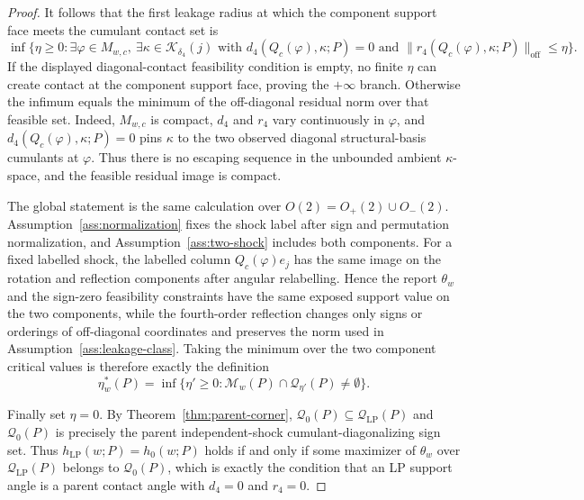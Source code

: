 \documentclass[11pt]{article}
\theoremstyle{definition}
\theoremstyle{plain}
\theoremstyle{remark}
\begin{document}
\begin{proof}
It follows that the first leakage radius at which the component support face meets the cumulant contact set is
\[
\inf\{\eta\ge0:
\exists \varphi\in M_{w,c},\ \exists\kappa\in\mathcal K_{\delta_4}(j)
\text{ with }d_4(Q_c(\varphi),\kappa;P)=0
\text{ and }\|r_4(Q_c(\varphi),\kappa;P)\|_{\mathrm{off}}\le\eta\}.
\]
If the displayed diagonal-contact feasibility condition is empty, no finite \(\eta\) can create contact at the component support face, proving the \(+\infty\) branch.  Otherwise the infimum equals the minimum of the off-diagonal residual norm over that feasible set.  Indeed, \(M_{w,c}\) is compact, \(d_4\) and \(r_4\) vary continuously in \(\varphi\), and \(d_4(Q_c(\varphi),\kappa;P)=0\) pins \(\kappa\) to the two observed diagonal structural-basis cumulants at \(\varphi\).  Thus there is no escaping sequence in the unbounded ambient \(\kappa\)-space, and the feasible residual image is compact.

The global statement is the same calculation over \(O(2)=O_+(2)\cup O_-(2)\).  Assumption~\ref{ass:normalization} fixes the shock label after sign and permutation normalization, and Assumption~\ref{ass:two-shock} includes both components.  For a fixed labelled shock, the labelled column \(Q_c(\varphi)e_j\) has the same image on the rotation and reflection components after angular relabelling.  Hence the report \(\theta_w\) and the sign-zero feasibility constraints have the same exposed support value on the two components, while the fourth-order reflection changes only signs or orderings of off-diagonal coordinates and preserves the norm used in Assumption~\ref{ass:leakage-class}.  Taking the minimum over the two component critical values is therefore exactly the definition
\[
\eta_w^*(P)=
\inf\{\eta'\ge0:\mathcal M_w(P)\cap\mathcal Q_{\eta'}(P)\ne\emptyset\}.
\]

Finally set \(\eta=0\).  By Theorem~\ref{thm:parent-corner}, \(\mathcal Q_0(P)\subseteq\mathcal Q_{\mathrm{LP}}(P)\) and \(\mathcal Q_0(P)\) is precisely the parent independent-shock cumulant-diagonalizing sign set.  Thus \(h_{\mathrm{LP}}(w;P)=h_0(w;P)\) holds if and only if some maximizer of \(\theta_w\) over \(\mathcal Q_{\mathrm{LP}}(P)\) belongs to \(\mathcal Q_0(P)\), which is exactly the condition that an LP support angle is a parent contact angle with \(d_4=0\) and \(r_4=0\).


\end{proof}
\end{document}
